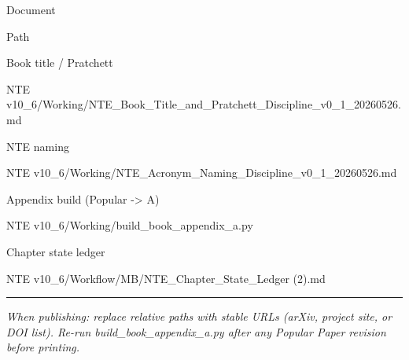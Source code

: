 \documentclass[
  11pt,
]{article}
\begin{document}
Document

Path

Book title / Pratchett

NTE
v10\_6/Working/NTE\_Book\_Title\_and\_Pratchett\_Discipline\_v0\_1\_20260526.md

NTE naming

NTE v10\_6/Working/NTE\_Acronym\_Naming\_Discipline\_v0\_1\_20260526.md

Appendix build (Popular -\textgreater{} A)

NTE v10\_6/Working/build\_book\_appendix\_a.py

Chapter state ledger

NTE v10\_6/Workflow/MB/NTE\_Chapter\_State\_Ledger (2).md

\begin{center}\rule{0.5\linewidth}{0.5pt}\end{center}

\emph{When publishing: replace relative paths with stable URLs (arXiv,
project site, or DOI list). Re-run build\_book\_appendix\_a.py after any
Popular Paper revision before printing.}
\end{document}

